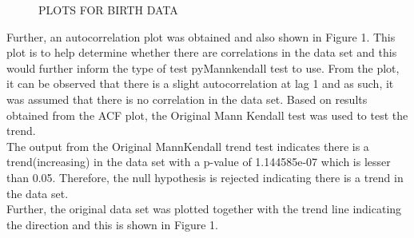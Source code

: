 \documentclass[12pt, letterpaper, twoside]{article}
\begin{document}
\begin{figure}
		    \caption{PLOTS FOR BIRTH DATA}
		        \label{fig:1}
\end{figure}
Further, an  autocorrelation plot was obtained and also shown in Figure 1. This plot is to help determine whether there are correlations in the data set and this would further inform the type of test pyMannkendall test to use. From the plot, it can be observed that there is a slight autocorrelation at lag 1 and as such, it was assumed that there is no correlation in the data set.                                                                                    
Based on results obtained from the ACF plot, the Original Mann Kendall test was used to test the trend.\\The output from the Original MannKendall trend test indicates there is a trend(increasing) in the data set with a p-value of 1.144585e-07 which is lesser than 0.05. Therefore, the null hypothesis is rejected indicating there is a trend in the data set.\\ Further, the original data set was plotted together with the trend line indicating the direction and this is shown in Figure 1.
\end{document}
